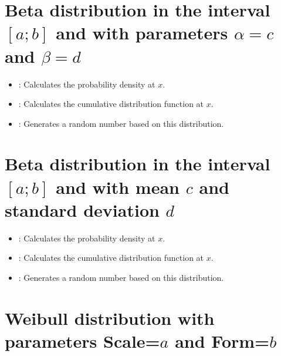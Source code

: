 \section{Beta distribution in the interval \texorpdfstring{$[a;b]$}{[a;b]} and with parameters \texorpdfstring{$\alpha=c$}{c} and \texorpdfstring{$\beta=d$}{d}}

\begin{itemize}

\item
{}:
Calculates the probability density at $x$.

\item
{}:
Calculates the cumulative distribution function at $x$.

\item
{}:
Generates a random number based on this distribution.

\end{itemize}



\section{Beta distribution in the interval \texorpdfstring{$[a;b]$}{[a;b]} and with mean \texorpdfstring{$c$}{c} and standard deviation \texorpdfstring{$d$}{d}}

\begin{itemize}

\item
{}:
Calculates the probability density at $x$.

\item
{}:
Calculates the cumulative distribution function at $x$.

\item
{}:
Generates a random number based on this distribution.

\end{itemize}



\section{Weibull distribution with parameters Scale=\texorpdfstring{$a$}{a} and Form=\texorpdfstring{$b$}{b}}

